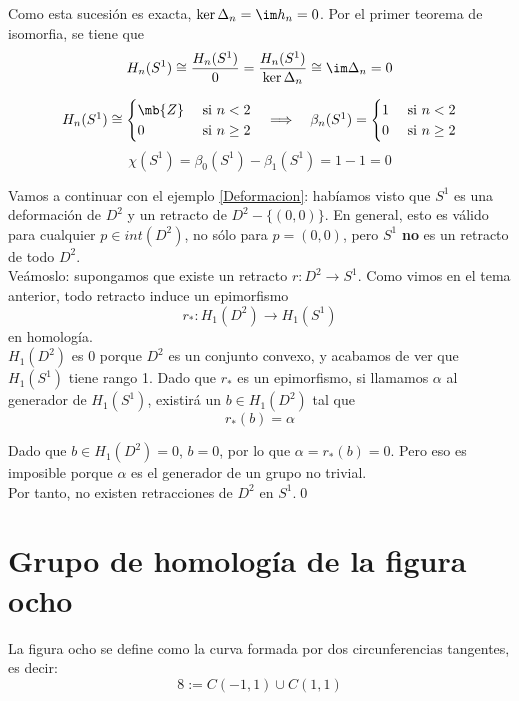 Como esta sucesión es exacta, $\ker \Delta_n=\im h_n=0$. Por el primer teorema de isomorfia, se tiene que $$H_n(S^1) \cong \frac{H_n(S^1)}{0}=\frac{H_n(S^1)}{\ker \Delta_n} \cong \im \Delta_n=0$$

\begin{teo}\label{HomoS1}
\[\begin{array}{ccc}
H_n(S^1)\cong
\begin{cases}
\mb{Z}&\mbox{ si }n < 2\\
0     &\mbox{ si }n \geq 2
\end{cases}
&\implies&
\beta_n(S^1)=
\begin{cases}
1 &\mbox{ si }n < 2\\
0 &\mbox{ si }n \geq 2
\end{cases}
\end{array}\]
$$\chi(S^1)=\beta_0(S^1)-\beta_1(S^1)=1-1=0$$
\end{teo}

\begin{ejem}
Vamos a continuar con el ejemplo \ref{Deformacion}: habíamos visto que $S^1$ es una deformación de $D^2$ y un retracto de $D^2-\{(0,0)\}$. En general, esto es válido para cualquier $p \in int(D^2)$, no sólo para $p=(0,0)$, pero $S^1$ \textbf{no} es un retracto de todo $D^2$.
\\

Veámoslo: supongamos que existe un retracto $r: D^2 \longrightarrow S^1$. Como vimos en el tema anterior, todo retracto induce un epimorfismo $$r_*: H_1(D^2) \longrightarrow H_1(S^1)$$ en homología.
\\

$H_1(D^2)$ es 0 porque $D^2$ es un conjunto convexo, y acabamos de ver que $H_1(S^1)$ tiene rango 1. Dado que $r_*$ es un epimorfismo, si llamamos $\alpha$ al generador de $H_1(S^1)$, existirá un $b \in H_1(D^2)$ tal que $$r_*(b)=\alpha$$

Dado que $b \in H_1(D^2)=0$, $b=0$, por lo que $\alpha=r_*(b)=0$. Pero eso es imposible porque $\alpha$ es el generador de un grupo no trivial.
\\

Por tanto, no existen retracciones de $D^2$ en $S^1$.\qed
\end{ejem}

\section{Grupo de homología de la figura ocho}
La figura ocho se define como la curva formada por dos circunferencias tangentes, es decir: $$8:=C(-1,1)\cup C(1,1)$$

